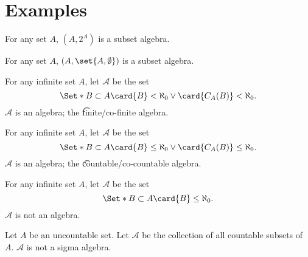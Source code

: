 \section*{Examples}

\begin{example}
For any set $A$, $(A, 2^{A})$ is a subset algebra.\end{example}
\begin{example}
For any set $A$, $(A, \set{A, \emptyset})$ is a subset algebra.\end{example}
\begin{example}
For any infinite set $A$, let $\mathcal{A} $ be the set
  \[
\Set*{
B \subset A
}{
\card{B} < \aleph_0 \lor
\card{C_{A}(B)} < \aleph_0
}.
  \]
$\mathcal{A} $ is an algebra;
the
\t{finite/co-finite algebra}.\end{example}
\begin{example}
For any infinite set $A$, let $\mathcal{A} $ be the set
  \[
\Set*{
B \subset A
}{
\card{B} \leq \aleph_0 \lor
\card{C_{A}(B)} \leq \aleph_0
}.
  \]
$\mathcal{A} $ is an algebra; the \t{countable/co-countable algebra}.\end{example}
\begin{example}
For any infinite set $A$, let $\mathcal{A} $ be the set
  \[
\Set*{
B \subset A
}{
\card{B} \leq \aleph_0
}.
  \]
$\mathcal{A} $ is not an algebra.\end{example}
\begin{example}
Let $A$ be an uncountable set.
Let $\mathcal{A} $ be the collection of all countable subsets of $A$.
$\mathcal{A} $ is not a sigma algebra.\end{example}